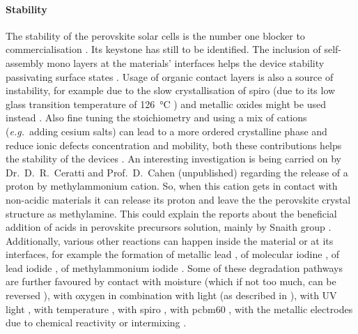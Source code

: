 	\paragraph{Stability}\label{intro_stability}
	The stability of the perovskite solar cells is the number one blocker to commercialisation \cite{Reyna2018}.
	Its keystone has still to be identified.
	The inclusion of self\hyp{}assembly mono layers at the materials' interfaces helps the device stability passivating surface states \cite{Lira-Cantu2017,Mingorance2018}.
	Usage of organic contact layers is also a source of instability, for example due to the slow crystallisation of \gls{spiro} \cite{Malinauskas2015} (due to its low glass transition temperature of \SI{126}{\celsius} \cite{Malinauskas2016}) and metallic oxides might be used instead \cite{Mingorance2018}.
	Also fine tuning the stoichiometry and using a mix of cations (\textsl{e.g.}\ adding cesium salts) can lead to a more ordered crystalline phase and reduce ionic defects concentration and mobility, both these contributions helps the stability of the devices \cite{Reyna2018}.
	An interesting investigation is being carried on by Dr.\ D.\ R.\ Ceratti and Prof.\ D.\ Cahen (unpublished) regarding the release of a proton by methylammonium cation.
	So, when this cation gets in contact with non-acidic materials it can release its proton and leave the the perovskite crystal structure as methylamine.
	This could explain the reports about the beneficial addition of acids in perovskite precursors solution, mainly by Snaith group \cite{Noel2017,Zhang2015a,Nayak2016}.
	Additionally, various other reactions can happen inside the material or at its interfaces, for example the formation of metallic lead \cite{Birkhold2018a,Sadoughi2015}, of molecular iodine \cite{Minns2017}, of lead iodide \cite{Buin2015,Walsh2015}, of methylammonium iodide \cite{Walsh2015}.
	Some of these degradation pathways are further favoured by contact with moisture \cite{Jong2018,Schlipf2019,Hu2017,Han2015a} (which if not too much, can be reversed \cite{Leguy2015}), with oxygen in combination with light \cite{Senocrate2018a,Aristidou2017} (as described in ), with UV light \cite{Lee2016}, with temperature \cite{Philippe2015,Conings2015}, with \gls{spiro} \cite{Carrillo2016,Kim2017,Kim2016a}, with \gls{pcbm60} \cite{DeBastiani2016}, with the metallic electrodes due to chemical reactivity \cite{Kato2015,Guerrero2016a,Back2016,Zhao2016,DeBastiani2016} or intermixing \cite{Domanski2016}.


